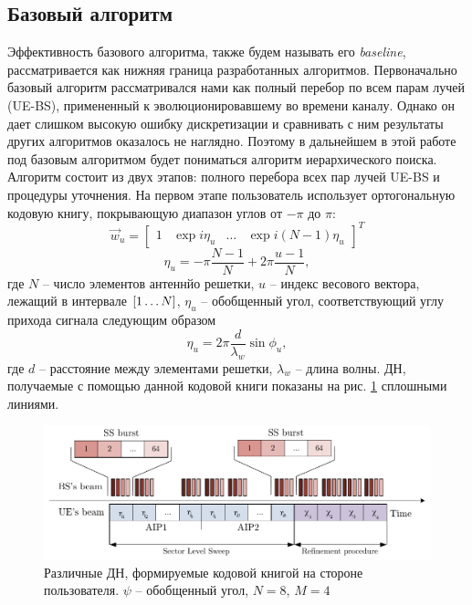 \subsection{Базовый алгоритм}
Эффективность базового алгоритма, также будем называть его \textit{baseline}, рассматривается как нижняя граница разработанных алгоритмов.
Первоначально базовый алгоритм рассматривался нами как полный перебор по всем парам лучей (UE-BS), примененный к эволюционировавшему во времени каналу.
Однако он дает слишком высокую ошибку дискретизации и сравнивать с ним результаты других алгоритмов оказалось не наглядно. Поэтому в дальнейшем в этой работе под базовым алгоритмом будет пониматься
алгоритм иерархического поиска. Алгоритм состоит из двух этапов: полного перебора всех пар лучей UE-BS и процедуры уточнения.
На первом этапе пользователь использует ортогональную кодовую книгу, покрывающую диапазон углов от $-\pi$ до $\pi$:
\begin{equation}
    \vec w_u =
    \begin{bmatrix}
        1 & \exp {i \eta_u} & \dots & \exp{i(N-1)\eta_u}
    \end{bmatrix}^T
\end{equation}
\begin{equation}
    \eta_u = -\pi \frac{N-1}{N} + 2\pi \frac{u-1}{N},
\end{equation}
где $N$ -- число элементов антеннйо решетки, $u$ -- индекс весового вектора, лежащий в интервале $\qty[1 \dots N]$, $\eta_u$ -- обобщенный угол, соответствующий углу прихода сигнала следующим образом
\begin{equation}
    \eta_u = 2\pi \frac{d}{\lambda_w}\sin\phi_u,
\end{equation}
где $d$ -- расстояние между элементами решетки, $\lambda_w$ -- длина волны. ДН,
получаемые с помощью данной кодовой книги показаны на рис. \ref{fig:4.9}
сплошными линиями.
\begin{figure}[ht]
    \centering
    \includegraphics[width=0.5\linewidth]{figs/fig4.9}
    \caption{Различные ДН, формируемые кодовой книгой на стороне пользователя. $\psi$ -- обобщенный угол, $N=8$, $M=4$}
    \label{fig:4.9}
\end{figure}

